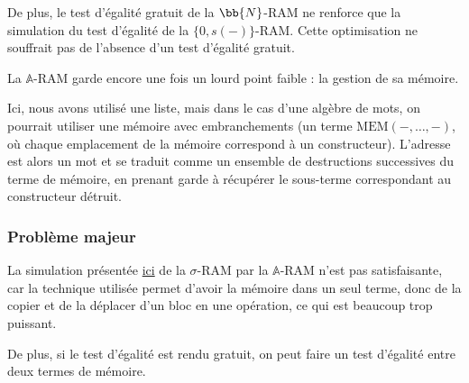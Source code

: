 \documentclass{report}
\newcommand{\bbA}{\mathbb{A}}
\begin{document}
				De plus, le test d'égalité gratuit de la $\bb{N}$-RAM ne renforce que la simulation du test d'égalité de la $\{0,s(-)\}$-RAM. Cette optimisation ne souffrait pas de l'absence d'un test d'égalité gratuit. 
				
				La $\bbA$-RAM garde encore une fois un lourd point faible : la gestion de sa mémoire.
				
				Ici, nous avons utilisé une liste, mais dans le cas d'une algèbre de mots, on pourrait utiliser une mémoire avec embranchements (un terme $\text{MEM}\left( -, \dots, -\right)$, où chaque emplacement de la mémoire correspond à un constructeur). L'adresse est alors un mot et se traduit comme un ensemble de destructions successives du terme de mémoire, en prenant garde à récupérer le sous-terme correspondant au constructeur détruit.
				
				

				\subsubsection{Problème majeur}

				La simulation présentée \hyperref[par:sim_sigma_RAM_A_RAM]{ici} de la $\sigma$-RAM par la $\bbA$-RAM n'est pas satisfaisante, car la technique utilisée permet d'avoir la mémoire dans un seul terme, donc de la copier et de la déplacer d'un bloc en une opération, ce qui est beaucoup trop puissant. 
				
				De plus, si le test d'égalité est rendu gratuit, on peut faire un test d'égalité entre deux termes de mémoire.






%		
%			
%			
			
			
	
			
\end{document}
